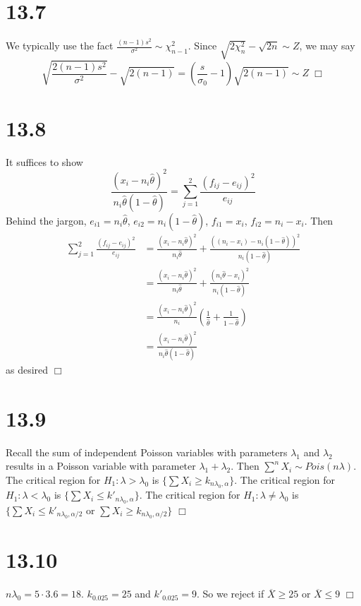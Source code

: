 \documentclass{article}
\begin{document}
\section*{13.7}
We typically use the fact $\frac{(n-1)s^2}{\sigma^2} \sim \chi^2_{n-1}$. Since $\sqrt{2\chi^2_n}-\sqrt{2n} \sim Z$, we may say
$$\sqrt{\frac{2(n-1)s^2}{\sigma^2}} -\sqrt{2(n-1)} = \left(\frac{s}{\sigma_0}-1\right)\sqrt{2(n-1)} \sim Z \;\Box$$

\section*{13.8}
It suffices to show
$$\frac{(x_i-n_i\hat{\theta})^2}{n_i\hat{\theta}(1-\hat{\theta})} = \sum\limits_{j=1}^{2}\frac{(f_{ij}-e_{ij})^2}{e_{ij}}$$
Behind the jargon, $e_{i1} = n_i\hat{\theta}$, $e_{i2} = n_i(1-\hat{\theta})$, $f_{i1} = x_i$, $f_{i2} = n_i - x_i$. Then
\begin{equation*}
\begin{split}
\sum\limits_{j=1}^{2}\frac{(f_{ij}-e_{ij})^2}{e_{ij}} &= \frac{(x_i-n_i\hat{\theta})^2}{n_i\hat{\theta}} + \frac{((n_i-x_i)-n_i(1-\hat{\theta}))^2}{n_i(1-\hat{\theta})}\\
&= \frac{(x_i-n_i\hat{\theta})^2}{n_i\hat{\theta}} + \frac{(n_i\hat{\theta}-x_i)^2}{n_i(1-\hat{\theta})}\\
&= \frac{(x_i-n_i\hat{\theta})^2}{n_i}\left(\frac{1}{\hat{\theta}}+\frac{1}{1-\hat{\theta}} \right)\\
&= \frac{(x_i-n_i\hat{\theta})^2}{n_i\hat{\theta}(1-\hat{\theta})}
\end{split}
\end{equation*}
as desired $\Box$

\section*{13.9}
Recall the sum of independent Poisson variables with parameters $\lambda_1$ and $\lambda_2$ results in a Poisson variable with parameter $\lambda_1+\lambda_2$. Then $\sum\limits^n X_i \sim Pois(n\lambda)$. The critical region for $H_1 : \lambda > \lambda_0$ is $\{\sum X_i \geqslant k_{n\lambda_0,\alpha}\}$. The critical region for $H_1 : \lambda < \lambda_0$ is $\{\sum X_i \leqslant k'_{n\lambda_0,\alpha}\}$. The critical region for $H_1 : \lambda \neq \lambda_0$ is $\{\sum X_i 
\leqslant k'_{n\lambda_0, \alpha/2} \textrm{ or } \sum X_i \geqslant k_{n\lambda_0, \alpha/2} \}$ $\Box$

\section*{13.10}
$n\lambda_0 = 5\cdot3.6 = 18$. $k_0.025 = 25$ and $k'_0.025 = 9$. So we reject if $\overline{X} \geqslant 25$ or $\overline{X} \leqslant 9$ $\Box$
\end{document}
